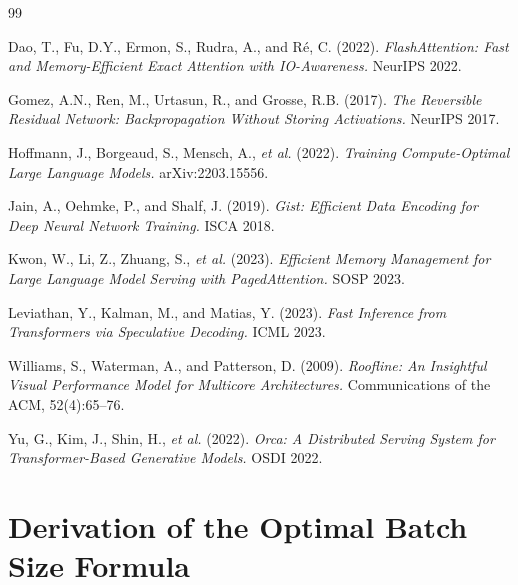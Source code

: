 \documentclass[11pt,a4paper]{article}
\begin{document}

\begin{thebibliography}{99}

Dao, T., Fu, D.Y., Ermon, S., Rudra, A., and R{\'e}, C. (2022).
\textit{FlashAttention: Fast and Memory-Efficient Exact Attention with
IO-Awareness.} NeurIPS 2022.

Gomez, A.N., Ren, M., Urtasun, R., and Grosse, R.B. (2017).
\textit{The Reversible Residual Network: Backpropagation Without Storing
Activations.} NeurIPS 2017.

Hoffmann, J., Borgeaud, S., Mensch, A., \textit{et al.} (2022).
\textit{Training Compute-Optimal Large Language Models.}
arXiv:2203.15556.

Jain, A., Oehmke, P., and Shalf, J. (2019).
\textit{Gist: Efficient Data Encoding for Deep Neural Network Training.}
ISCA 2018.

Kwon, W., Li, Z., Zhuang, S., \textit{et al.} (2023).
\textit{Efficient Memory Management for Large Language Model Serving with
PagedAttention.} SOSP 2023.

Leviathan, Y., Kalman, M., and Matias, Y. (2023).
\textit{Fast Inference from Transformers via Speculative Decoding.}
ICML 2023.

Williams, S., Waterman, A., and Patterson, D. (2009).
\textit{Roofline: An Insightful Visual Performance Model for Multicore
Architectures.} Communications of the ACM, 52(4):65--76.

Yu, G., Kim, J., Shin, H., \textit{et al.} (2022).
\textit{Orca: A Distributed Serving System for Transformer-Based Generative
Models.} OSDI 2022.

\end{thebibliography}

\appendix

\section{Derivation of the Optimal Batch Size Formula}
\label{app:batch-derivation}
\end{document}

